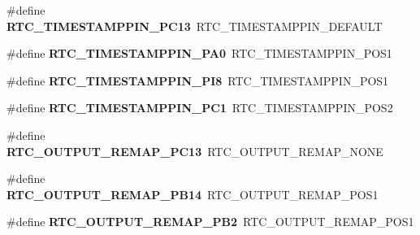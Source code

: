 \begin{DoxyCompactItemize}
\#define {\bfseries R\+T\+C\+\_\+\+T\+I\+M\+E\+S\+T\+A\+M\+P\+P\+I\+N\+\_\+\+P\+C13}~R\+T\+C\+\_\+\+T\+I\+M\+E\+S\+T\+A\+M\+P\+P\+I\+N\+\_\+\+D\+E\+F\+A\+U\+LT
\item 
\mbox{\label{group___h_a_l___r_t_c___aliased___defines_ga8d806818f1fcdaf744042a19563a8052}} 
\#define {\bfseries R\+T\+C\+\_\+\+T\+I\+M\+E\+S\+T\+A\+M\+P\+P\+I\+N\+\_\+\+P\+A0}~R\+T\+C\+\_\+\+T\+I\+M\+E\+S\+T\+A\+M\+P\+P\+I\+N\+\_\+\+P\+O\+S1
\item 
\mbox{\label{group___h_a_l___r_t_c___aliased___defines_ga06c626929730d0b055830978be00b438}} 
\#define {\bfseries R\+T\+C\+\_\+\+T\+I\+M\+E\+S\+T\+A\+M\+P\+P\+I\+N\+\_\+\+P\+I8}~R\+T\+C\+\_\+\+T\+I\+M\+E\+S\+T\+A\+M\+P\+P\+I\+N\+\_\+\+P\+O\+S1
\item 
\mbox{\label{group___h_a_l___r_t_c___aliased___defines_ga8bed03c3348ec3005e7b80e73fd13cc0}} 
\#define {\bfseries R\+T\+C\+\_\+\+T\+I\+M\+E\+S\+T\+A\+M\+P\+P\+I\+N\+\_\+\+P\+C1}~R\+T\+C\+\_\+\+T\+I\+M\+E\+S\+T\+A\+M\+P\+P\+I\+N\+\_\+\+P\+O\+S2
\item 
\mbox{\label{group___h_a_l___r_t_c___aliased___defines_ga677d55aef2a7915a4a75befab8a5abaf}} 
\#define {\bfseries R\+T\+C\+\_\+\+O\+U\+T\+P\+U\+T\+\_\+\+R\+E\+M\+A\+P\+\_\+\+P\+C13}~R\+T\+C\+\_\+\+O\+U\+T\+P\+U\+T\+\_\+\+R\+E\+M\+A\+P\+\_\+\+N\+O\+NE
\item 
\mbox{\label{group___h_a_l___r_t_c___aliased___defines_gac67309963a2eaf95230e716c8e3f0377}} 
\#define {\bfseries R\+T\+C\+\_\+\+O\+U\+T\+P\+U\+T\+\_\+\+R\+E\+M\+A\+P\+\_\+\+P\+B14}~R\+T\+C\+\_\+\+O\+U\+T\+P\+U\+T\+\_\+\+R\+E\+M\+A\+P\+\_\+\+P\+O\+S1
\item 
\mbox{\label{group___h_a_l___r_t_c___aliased___defines_gae3219018581da1cc5687fe218d3f2a2d}} 
\#define {\bfseries R\+T\+C\+\_\+\+O\+U\+T\+P\+U\+T\+\_\+\+R\+E\+M\+A\+P\+\_\+\+P\+B2}~R\+T\+C\+\_\+\+O\+U\+T\+P\+U\+T\+\_\+\+R\+E\+M\+A\+P\+\_\+\+P\+O\+S1
\item 
\mbox{\label{group___h_a_l___r_t_c___aliased___defines_ga203603ca0741ea3f23beca505a121351}} 

\end{DoxyCompactItemize}
